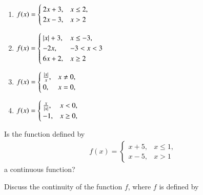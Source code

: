 \begin{enumerate}
\item 
$
\begin{alignedat}[t]{2}
f(x)=
\begin{cases}
2x+3, & x \le 2,
\\
2x-3, & x > 2
\end{cases}
\end{alignedat}
$
%
\item 
$
\begin{alignedat}[t]{2}
f(x)=
\begin{cases}
\left\vert x\right\vert+3, & x \le -3,
\\
-2x, & -3 < x < 3
\\
6x+2, & x \ge 2
\end{cases}
\end{alignedat}
$
\item 
$
\begin{alignedat}[t]{2}
f(x)=
\begin{cases}
\frac{\left\vert x\right\vert}{x}, & x \ne 0,
\\
0, & x = 0,
\end{cases}
\end{alignedat}
$
\item 
$
\begin{alignedat}[t]{2}
f(x)=
\begin{cases}
\frac{x}{\left\vert x\right\vert}, & x < 0,
\\
-1, & x \ge 0,
\end{cases}
\end{alignedat}
$
\end{enumerate}
%
\item Is the function defined by 
%
\begin{align}
f(x)=
\begin{cases}
x+5, & x \le 1,
\\
x-5, & x > 1
\end{cases}
\end{align}
%
a continuous function?
\item Discuss the continuity of the function $f$, where $f$ is defined by 
